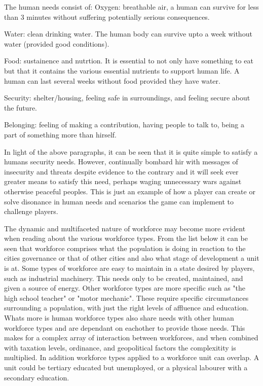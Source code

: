 The human needs consist of:
Oxygen: breathable air, a human can survive for less than 3 minutes without suffering potentially serious consequences. 

Water: clean drinking water. The human body can survive upto a week without water (provided good conditions). 

Food: sustainence and nutrtion. It is essential to not only have something to eat but that it contains the various essential nutrients to support human life. A human can last several weeks without food provided they have water.

Security: shelter/housing, feeling safe in surroundings, and feeling secure about the future.

Belonging: feeling of making a contribution, having people to talk to, being a part of something more than hirself.

In light of the above paragraphs, it can be seen that it is quite simple to satisfy a humans security needs. However, continually bombard hir with messages of insecurity and threats despite evidence to the contrary and it will seek ever greater means to satisfy this need, perhaps waging unnecessary wars against otherwise peaceful peoples. This is just an example of how a player can create or solve disonance in human needs and scenarios the game can implement to challenge players.



The dynamic and multifaceted nature of workforce may become more evident when reading about the various workforce types. From the list below it can be seen that workforce comprises what the population is doing in reaction to the cities governance or that of other cities and also what stage of development a unit is at. Some types of workforce are easy to maintain in a state desired by players, such as industrial machinery. This needs only to be created, maintained, and given a source of energy. Other workforce types are more specific such as "the high school teacher" or "motor mechanic". These require specific circumstances surrounding a population, with just the right levels of affluence and education. Whats more is human workforce types also share needs with other human workforce types and are dependant on eachother to provide those needs. This makes for a complex array of interaction between workforces, and when combined with taxation levels, ordinance, and geopolitical factors the complexitity is multiplied. In addition workforce types applied to a workforce unit can overlap. A unit could be tertiary educated but unemployed, or a physical labourer with a secondary education. 

